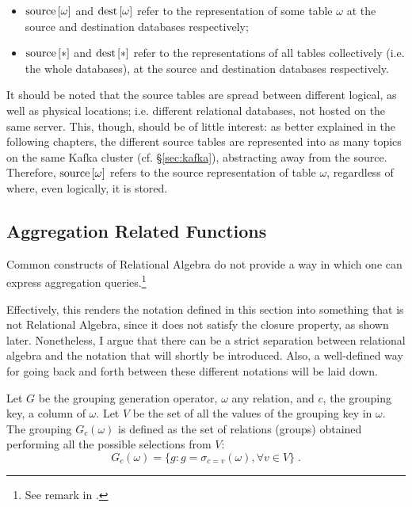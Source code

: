 \begin{itemize}
	\item $\text{source}\left[{\omega}\right]$ and $\text{dest}\left[{\omega}\right]$ refer to the representation of some table $\omega$ at the source and destination databases respectively;
	\item $\text{source}\left[{*}\right]$ and $\text{dest}\left[{*}\right]$ refer to the representations of all tables collectively (i.e. the whole databases), at the source and destination databases respectively.
\end{itemize}

It should be noted that the source tables are spread between different logical, as well as physical locations; i.e. different relational databases, not hosted on the same server.
This, though, should be of little interest: as better explained in the following chapters, the different source tables are represented into as many topics on the same Kafka cluster (cf. \S \ref{sec:kafka}), abstracting away from the source.
Therefore, $\text{source}\left[{\omega}\right]$ refers to the source representation of table $\omega$, regardless of where, even logically, it is stored.


\subsection{Aggregation Related Functions}

Common constructs of Relational Algebra do not provide a way in which one can express aggregation queries.\footnote{%
See remark in \cite[p.~154]{dbms}.
}

Effectively, this renders the notation defined in this section into something that is not Relational Algebra, since it does not satisfy the closure property, as shown later.
Nonetheless, I argue that there can be a strict separation between relational algebra and the notation that will shortly be introduced.
Also, a well-defined way for going back and forth between these different notations will be laid down.

\begin{definition}\label{def:G}
Let $G$ be the grouping generation operator, $\omega$ any relation, and $c$, the grouping key, a column of $\omega$.
Let $V$ be the set of all the values of the grouping key in $\omega$.
The grouping $G_c(\omega)$ is defined as the set of relations (groups) obtained performing all the possible selections from $V$:
$$
G_c(\omega) = \{
    g : g = \sigma_{c = v}(\omega), \forall v \in V
\} \; .
$$
\end{definition}

